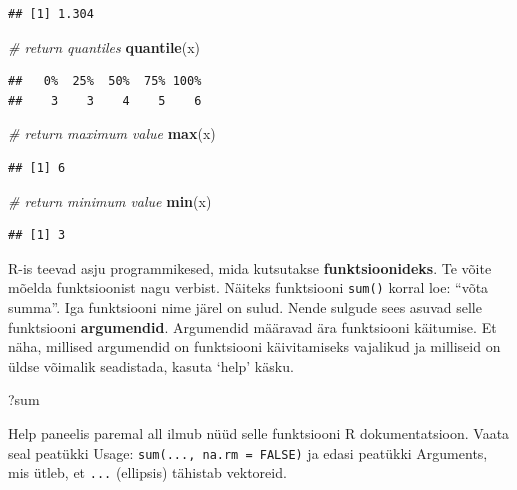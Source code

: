 \documentclass[]{book}
\newenvironment{Shaded}{\begin{snugshade}}{\end{snugshade}}
\newcommand{\KeywordTok}[1]{\textcolor[rgb]{0.13,0.29,0.53}{\textbf{#1}}}
\newcommand{\CommentTok}[1]{\textcolor[rgb]{0.56,0.35,0.01}{\textit{#1}}}
\newcommand{\NormalTok}[1]{#1}
\begin{document}
\begin{verbatim}
## [1] 1.304
\end{verbatim}

\begin{Shaded}
\begin{Highlighting}[]
\CommentTok{# return quantiles}
\KeywordTok{quantile}\NormalTok{(x)}
\end{Highlighting}
\end{Shaded}

\begin{verbatim}
##   0%  25%  50%  75% 100% 
##    3    3    4    5    6
\end{verbatim}

\begin{Shaded}
\begin{Highlighting}[]
\CommentTok{# return maximum value}
\KeywordTok{max}\NormalTok{(x)}
\end{Highlighting}
\end{Shaded}

\begin{verbatim}
## [1] 6
\end{verbatim}

\begin{Shaded}
\begin{Highlighting}[]
\CommentTok{# return minimum value}
\KeywordTok{min}\NormalTok{(x)}
\end{Highlighting}
\end{Shaded}

\begin{verbatim}
## [1] 3
\end{verbatim}

R-is teevad asju programmikesed, mida kutsutakse
\textbf{funktsioonideks}. Te võite mõelda funktsioonist nagu verbist.
Näiteks funktsiooni \texttt{sum()} korral loe: ``võta summa''. Iga
funktsiooni nime järel on sulud. Nende sulgude sees asuvad selle
funktsiooni \textbf{argumendid}. Argumendid määravad ära funktsiooni
käitumise. Et näha, millised argumendid on funktsiooni käivitamiseks
vajalikud ja milliseid on üldse võimalik seadistada, kasuta `help'
käsku.

\begin{Shaded}
\begin{Highlighting}[]
\NormalTok{?sum}
\end{Highlighting}
\end{Shaded}

Help paneelis paremal all ilmub nüüd selle funktsiooni R
dokumentatsioon. Vaata seal peatükki Usage:
\texttt{sum(...,\ na.rm\ =\ FALSE)} ja edasi peatükki Arguments, mis
ütleb, et \texttt{...} (ellipsis) tähistab vektoreid.
\end{document}
